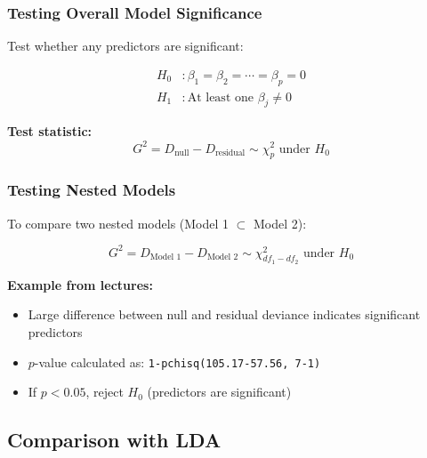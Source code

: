 \documentclass[12pt,a4paper]{article}
\begin{document}
\subsubsection{Testing Overall Model Significance}

Test whether any predictors are significant:

\begin{align}
H_0&: \beta_1 = \beta_2 = \cdots = \beta_p = 0 \\
H_1&: \text{At least one } \beta_j \neq 0
\end{align}

\textbf{Test statistic:}
\begin{equation}
G^2 = D_{\text{null}} - D_{\text{residual}} \sim \chi^2_p \text{ under } H_0
\end{equation}

\subsubsection{Testing Nested Models}

To compare two nested models (Model 1 $\subset$ Model 2):

\begin{equation}
G^2 = D_{\text{Model 1}} - D_{\text{Model 2}} \sim \chi^2_{df_1 - df_2} \text{ under } H_0
\end{equation}

\textbf{Example from lectures:}
\begin{itemize}
    \item Large difference between null and residual deviance indicates significant predictors
    \item $p$-value calculated as: \texttt{1-pchisq(105.17-57.56, 7-1)}
    \item If $p < 0.05$, reject $H_0$ (predictors are significant)
\end{itemize}

\subsection{Comparison with LDA}
\end{document}
